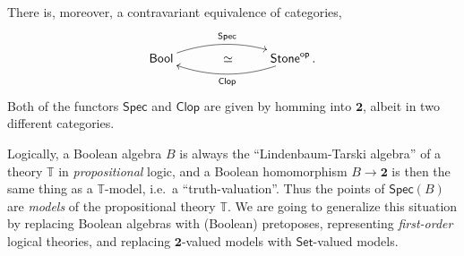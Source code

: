 \documentclass[12pt]{article}
\newcommand{\T}{\ensuremath{\mathbb{T}}}
\theoremstyle{remark}
\theoremstyle{definition}
\begin{document}
There is, moreover, a contravariant equivalence of categories,
\[
\xymatrix{ 
\mathsf{Bool}  \ar@/{}^{1pc}/[rr]^{\mathsf{Spec}}     & \quad\simeq &  \mathsf{Stone}^{\mathsf{op}}  \ar@/{}^{1pc}/[ll]^{\mathsf{Clop}} \,. \\
} 
\]
Both of the functors $\mathsf{Spec}$ and $\mathsf{Clop}$ are given by homming into $\mathbf{2}$, albeit in two different categories.

Logically, a Boolean algebra $B$  is always the ``Lindenbaum-Tarski algebra'' of a theory $\mathbb{T}$ in \emph{propositional} logic, and a Boolean homomorphism $B\to \mathbf{2}$ is then the same thing as a $\T$-model, i.e.\ a ``truth-valuation''.  Thus the points of $\mathsf{Spec}(B)$ are \emph{models} of the propositional theory $\mathbb{T}$.
We are going to generalize this situation by replacing Boolean algebras with (Boolean) pretoposes, representing \emph{first-order} logical theories, and replacing $\mathbf{2}$-valued models with $\mathsf{Set}$-valued models.
\end{document}
